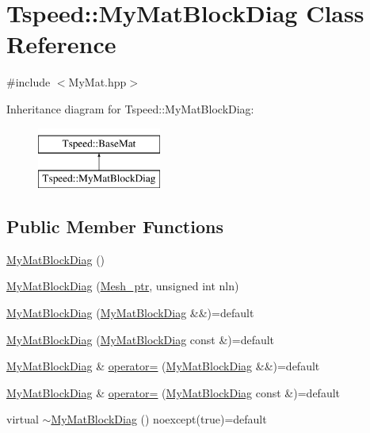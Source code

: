 \hypertarget{classTspeed_1_1MyMatBlockDiag}{\section{Tspeed\-:\-:My\-Mat\-Block\-Diag Class Reference}
\label{classTspeed_1_1MyMatBlockDiag}
}


{\ttfamily \#include $<$My\-Mat.\-hpp$>$}

Inheritance diagram for Tspeed\-:\-:My\-Mat\-Block\-Diag\-:\begin{figure}[H]
\begin{center}
\leavevmode
\includegraphics[height=2.000000cm]{classTspeed_1_1MyMatBlockDiag}
\end{center}
\end{figure}
\subsection*{Public Member Functions}
\begin{DoxyCompactItemize}
\item 
\hyperlink{classTspeed_1_1MyMatBlockDiag_a1edd89c439245f97a1cbfcf81b588211}{My\-Mat\-Block\-Diag} ()
\item 
\hyperlink{classTspeed_1_1MyMatBlockDiag_a2d740a6b014d37383f751b312ccdf66e}{My\-Mat\-Block\-Diag} (\hyperlink{namespaceTspeed_a7367a01365c4cc2c1a09305b3effc4e8}{Mesh\-\_\-ptr}, unsigned int nln)
\item 
\hyperlink{classTspeed_1_1MyMatBlockDiag_ae115b76e406285af1c3d41682ecc359c}{My\-Mat\-Block\-Diag} (\hyperlink{classTspeed_1_1MyMatBlockDiag}{My\-Mat\-Block\-Diag} \&\&)=default
\item 
\hyperlink{classTspeed_1_1MyMatBlockDiag_af6f41226563ccd37cc0113a50af2e0e7}{My\-Mat\-Block\-Diag} (\hyperlink{classTspeed_1_1MyMatBlockDiag}{My\-Mat\-Block\-Diag} const \&)=default
\item 
\hyperlink{classTspeed_1_1MyMatBlockDiag}{My\-Mat\-Block\-Diag} \& \hyperlink{classTspeed_1_1MyMatBlockDiag_a7e7efacca7a0a45f0df066155008ed36}{operator=} (\hyperlink{classTspeed_1_1MyMatBlockDiag}{My\-Mat\-Block\-Diag} \&\&)=default
\item 
\hyperlink{classTspeed_1_1MyMatBlockDiag}{My\-Mat\-Block\-Diag} \& \hyperlink{classTspeed_1_1MyMatBlockDiag_af98e9c0be1adb7bcdfc49f36f2e536d7}{operator=} (\hyperlink{classTspeed_1_1MyMatBlockDiag}{My\-Mat\-Block\-Diag} const \&)=default
\item 
virtual \hyperlink{classTspeed_1_1MyMatBlockDiag_a696ec354baf3873bf85a168a91e5afd7}{$\sim$\-My\-Mat\-Block\-Diag} () noexcept(true)=default
\end{DoxyCompactItemize}

